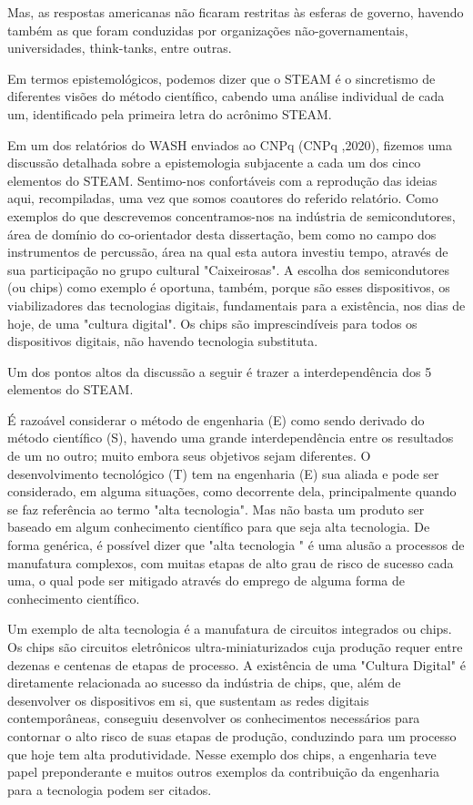 Mas, as respostas americanas não ficaram restritas às esferas de governo, havendo também as que foram conduzidas por organizações não-governamentais, universidades, think-tanks, entre outras.

Em termos epistemológicos, podemos dizer que o STEAM é o sincretismo de diferentes visões do método científico, cabendo uma análise individual de cada um, identificado pela primeira letra do acrônimo STEAM.

Em um dos relatórios do WASH enviados ao CNPq (CNPq ,2020), fizemos uma discussão detalhada sobre a epistemologia subjacente a cada um dos cinco elementos do STEAM. Sentimo-nos confortáveis com a reprodução das ideias aqui, recompiladas, uma vez que somos coautores do referido relatório. Como exemplos do que descrevemos concentramos-nos na indústria de semicondutores, área de domínio do co-orientador desta dissertação, bem como no campo dos instrumentos de percussão, área na qual esta autora investiu tempo, através de sua participação no grupo cultural "Caixeirosas". A escolha dos semicondutores (ou chips) como exemplo é oportuna, também, porque são esses dispositivos, os viabilizadores das tecnologias digitais, fundamentais para a existência, nos dias de hoje, de uma "cultura digital". Os chips são imprescindíveis para todos os dispositivos digitais, não havendo tecnologia substituta.

Um dos pontos altos da discussão a seguir é trazer a interdependência dos 5 elementos do STEAM.

É razoável considerar o método de engenharia (E) como sendo derivado do método científico (S), havendo uma grande interdependência entre os resultados de um no outro; muito embora seus objetivos sejam diferentes. O desenvolvimento tecnológico (T) tem na engenharia (E) sua aliada e pode ser considerado, em alguma situações, como decorrente dela, principalmente quando se faz referência ao termo "alta tecnologia". Mas não basta um produto ser baseado em algum conhecimento científico para que seja alta tecnologia. De forma genérica, é possível dizer que "alta tecnologia " é uma alusão a processos de manufatura complexos, com muitas etapas de alto grau de risco de sucesso cada uma, o qual pode ser mitigado através do emprego de alguma forma de conhecimento científico.

Um exemplo de alta tecnologia é a manufatura de circuitos integrados ou chips. Os chips são circuitos eletrônicos ultra-miniaturizados cuja produção requer entre dezenas e centenas de etapas de processo. A existência de uma "Cultura Digital" é diretamente relacionada ao sucesso da indústria de chips, que, além de desenvolver os dispositivos em si, que sustentam as redes digitais contemporâneas, conseguiu desenvolver os conhecimentos necessários para contornar o alto risco de suas etapas de produção, conduzindo para um processo que hoje tem alta produtividade. Nesse exemplo dos chips, a engenharia teve papel preponderante e muitos outros exemplos da contribuição da engenharia para a tecnologia podem ser citados.

